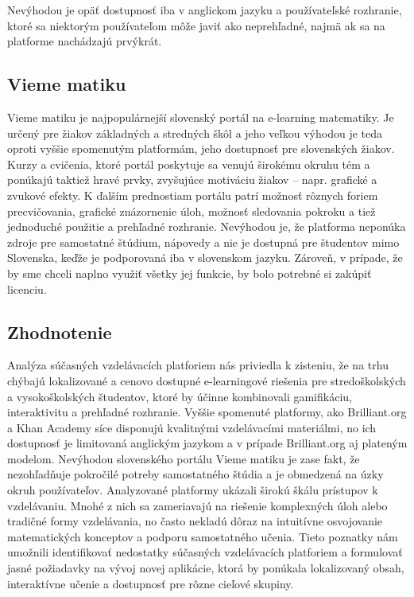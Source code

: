  Nevýhodou je opäť dostupnosť iba v anglickom jazyku a používateľské rozhranie, ktoré sa niektorým používateľom môže javiť ako neprehľadné, najmä ak sa na platforme nachádzajú prvýkrát.\cite{khanacademy}
\subsection{Vieme matiku}
Vieme matiku je najpopulárnejší slovenský portál na e-learning matematiky.
 Je určený pre žiakov základných a stredných škôl a jeho veľkou výhodou je teda oproti vyššie spomenutým platformám, jeho dostupnosť pre slovenských žiakov.
 Kurzy a cvičenia, ktoré portál poskytuje sa venujú širokému okruhu tém a ponúkajú taktiež hravé prvky, zvyšujúce motiváciu žiakov – napr. grafické a zvukové efekty.
 K ďalším prednostiam portálu patrí možnosť rôznych foriem precvičovania, grafické znázornenie úloh, možnosť sledovania pokroku a tiež jednoduché použitie a prehľadné rozhranie.
 Nevýhodou je, že platforma neponúka zdroje pre samostatné štúdium, nápovedy a nie je dostupná pre študentov mimo Slovenska, keďže je podporovaná iba v slovenskom jazyku.
 Zároveň, v prípade, že by sme chceli naplno využiť všetky jej funkcie, by bolo potrebné si zakúpiť licenciu.\cite{viemeto}
\subsection{Zhodnotenie}
Analýza súčasných vzdelávacích platforiem nás priviedla k zisteniu, že na trhu chýbajú lokalizované a cenovo dostupné e-learningové riešenia pre stredoškolských a vysokoškolských študentov, ktoré by účinne kombinovali gamifikáciu, interaktivitu a prehľadné rozhranie. 
Vyššie spomenuté platformy, ako Brilliant.org a Khan Academy síce disponujú kvalitnými vzdelávacími materiálmi, no ich dostupnosť je limitovaná anglickým jazykom a v prípade Brilliant.org aj plateným modelom.
Nevýhodou slovenského portálu Vieme matiku je zase fakt, že nezohľadňuje pokročilé potreby samostatného štúdia a je obmedzená na úzky okruh používateľov.
Analyzované platformy ukázali širokú škálu prístupov k vzdelávaniu. 
Mnohé z nich sa zameriavajú na riešenie komplexných úloh alebo tradičné formy vzdelávania, no často nekladú dôraz na intuitívne osvojovanie matematických konceptov a podporu samostatného učenia.
Tieto poznatky nám umožnili identifikovať nedostatky súčasných vzdelávacích platforiem a formulovať jasné požiadavky na vývoj novej aplikácie, ktorá by ponúkala lokalizovaný obsah, interaktívne učenie a dostupnosť pre rôzne cieľové skupiny.

